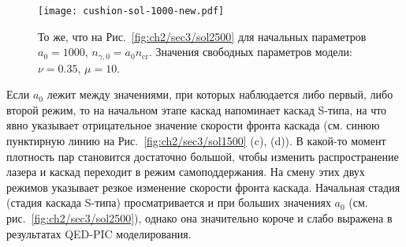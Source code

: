 
\begin{figure}[ht]
    \texttt{[image: cushion-sol-1000-new.pdf]}
    \caption[То же, что на Рис.~\ref{fig:ch2/sec3/sol2500} для начальных параметров $a_0=1000$, $n_{\gamma,0}=a_0 n_\mathrm{cr}$]{\label{fig:ch2/sec3/sol1000} 
    То же, что на Рис.~\ref{fig:ch2/sec3/sol2500} для начальных параметров $a_0=1000$, $n_{\gamma,0}=a_0 n_\mathrm{cr}$. Значения свободных параметров модели: $\nu=0.35$, $\mu=10$.}
\end{figure}

Если $a_0$ лежит между значениями, при которых наблюдается либо первый, либо второй режим, то на начальном этапе каскад напоминает каскад S-типа, на что явно указывает отрицательное значение скорости фронта каскада (см. синюю пунктирную линию на Рис.~\ref{fig:ch2/sec3/sol1500} (c), (d)). 
В какой-то момент плотность пар становится достаточно большой, чтобы изменить распространение лазера и каскад переходит в режим самоподдержания.
На смену этих двух режимов указывает резкое изменение скорости фронта каскада.
Начальная стадия (стадия каскада S-типа) просматривается и при больших значениях $a_0$ (см. рис.~\ref{fig:ch2/sec3/sol2500}), однако она значительно короче и слабо выражена в результатах QED-PIC моделирования.



